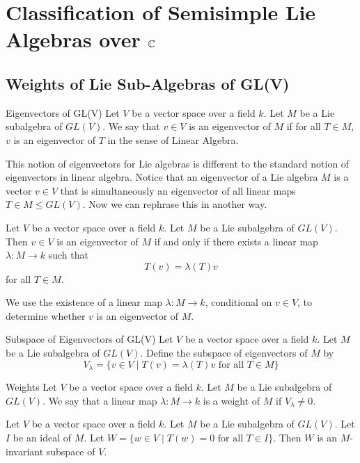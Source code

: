 \documentclass[a4paper]{article}
\begin{document}
\pagebreak
\section{Classification of Semisimple Lie Algebras over $\mathbb{C}$}
\subsection{Weights of Lie Sub-Algebras of GL(V)}
\begin{defn}{Eigenvectors of GL(V)}{} Let $V$ be a vector space over a field $k$. Let $M$ be a Lie subalgebra of $GL(V)$. We say that $v\in V$ is an eigenvector of $M$ if for all $T\in M$, $v$ is an eigenvector of $T$ in the sense of Linear Algebra. 
\end{defn}

This notion of eigenvectors for Lie algebras is different to the standard notion of eigenvectors in linear algebra. Notice that an eigenvector of a Lie algebra $M$ is a vector $v\in V$ that is simultaneously an eigenvector of all linear maps $T\in M\leq GL(V)$. Now we can rephrase this in another way. 

\begin{lmm}{}{} Let $V$ be a vector space over a field $k$. Let $M$ be a Lie subalgebra of $GL(V)$. Then $v\in V$ is an eigenvector of $M$ if and only if there exists a linear map $\lambda:M\to k$ such that $$T(v)=\lambda(T)v$$ for all $T\in M$. 
\end{lmm}

We use the existence of a linear map $\lambda:M\to k$, conditional on $v\in V$, to determine whether $v$ is an eigenvector of $M$. 

\begin{defn}{Subspace of Eigenvectors of GL(V)}{} Let $V$ be a vector space over a field $k$. Let $M$ be a Lie subalgebra of $GL(V)$. Define the subspace of eigenvectors of $M$ by $$V_\lambda=\{v\in V\;|\;T(v)=\lambda(T)v\text{ for all }T\in M\}$$
\end{defn}

\begin{defn}{Weights}{} Let $V$ be a vector space over a field $k$. Let $M$ be a Lie subalgebra of $GL(V)$. We say that a linear map $\lambda:M\to k$ is a weight of $M$ if $V_\lambda\neq 0$. 
\end{defn}

\begin{lmm}{}{} Let $V$ be a vector space over a field $k$. Let $M$ be a Lie subalgebra of $GL(V)$. Let $I$ be an ideal of $M$. Let $W=\{w\in V\;|\;T(w)=0\text{ for all }T\in I\}$. Then $W$ is an $M$-invariant subspace of $V$. 
\end{lmm}
\end{document}

